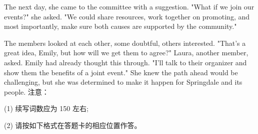 \documentclass{英语试卷}
\begin{document}
\par The next day, she came to the committee with a suggestion. "What if we join our events?" she asked. "We could share resources, work together on promoting, and most importantly, make sure both causes are supported by the community."\par
\par The members looked at each other, some doubtful, others interested. "That's a great idea, Emily, but how will we get them to agree?" Laura, another member, asked. Emily had already thought this through. "I'll talk to their organizer and show them the benefits of a joint event." She knew the path ahead would be challenging, but she was determined to make it happen for Springdale and its people. 注意：\par
\par (1) 续写词数应为 150 左右;\par
\par (2) 请按如下格式在答题卡的相应位置作答。\par
{}
\end{document}
